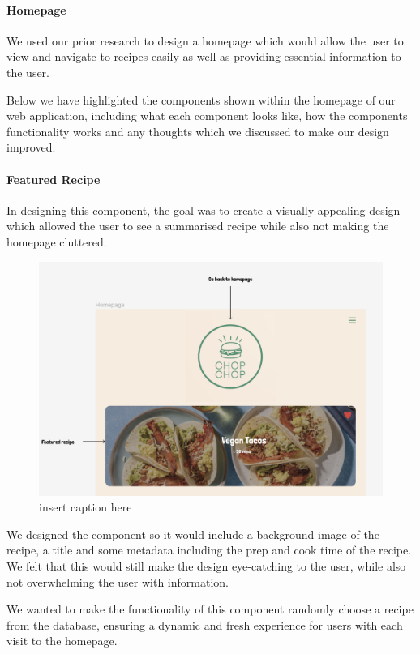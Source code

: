 \documentclass{article}
\begin{document}
\paragraph{Homepage}
We used our prior research to design a homepage which would allow the user to view and navigate to recipes easily as well as providing essential information to the user.

Below we have highlighted the components shown within the homepage of our web application, including what each component looks like, how the components functionality works and any thoughts which we discussed to make our design improved.

\paragraph{Featured Recipe}
In designing this component, the goal was to create a visually appealing design which allowed the user to see a summarised recipe while also not making the homepage cluttered.

\begin{figure}[htbp]
  \includegraphics[width=1.0\textwidth]{assets/Version 1 Featured Recipe.png}
  \centering
  \caption{insert caption here}
\end{figure}

We designed the component so it would include a background image of the recipe, a title and some metadata including the prep and cook time of the recipe. We felt that this would still make the design eye-catching to the user, while also not overwhelming the user with information.

We wanted to make the functionality of this component randomly choose a recipe from the database, ensuring a dynamic and fresh experience for users with each visit to the homepage.
\end{document}
